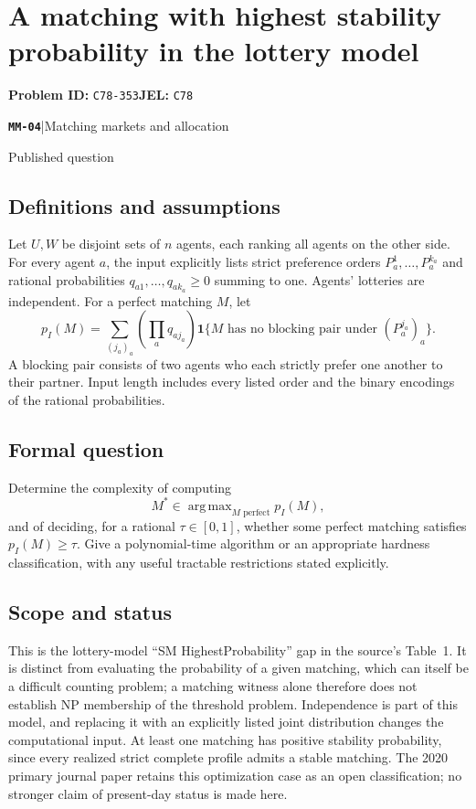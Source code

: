 \documentclass[11pt,a4paper]{article}
\newcommand{\ind}{\mathbf 1}
\DeclareMathOperator*{\argmax}{arg\,max}
\newcommand{\entrymeta}[3]{{\sffamily\small\color{muted}\textbf{\texttt{#1}}\quad|\quad #2\par #3\par}}
\begin{document}
\section*{A matching with highest stability probability in the lottery model}
\textbf{Problem ID:} \texttt{C78-353}\quad \textbf{JEL:} \texttt{C78}\par
\label{problem:OP-0545}
\label{beyond:MM-04}
\entrymeta{MM-04}{Matching markets and allocation}{Published question}
\subsection*{Definitions and assumptions}
Let $U,W$ be disjoint sets of $n$ agents, each ranking all agents on the other side. For every agent $a$, the input explicitly lists strict preference orders $P_a^1,\ldots,P_a^{k_a}$ and rational probabilities $q_{a1},\ldots,q_{ak_a}\ge0$ summing to one. Agents' lotteries are independent. For a perfect matching $M$, let
\[
 p_I(M)=\sum_{(j_a)_a}\left(\prod_a q_{a j_a}\right)
 \ind\{M\text{ has no blocking pair under }(P_a^{j_a})_a\}.
\]
A blocking pair consists of two agents who each strictly prefer one another to their partner. Input length includes every listed order and the binary encodings of the rational probabilities.
\subsection*{Formal question}
Determine the complexity of computing
\[
 M^*\in\argmax_{M\text{ perfect}}p_I(M),
\]
and of deciding, for a rational $\tau\in[0,1]$, whether some perfect matching satisfies $p_I(M)\ge\tau$. Give a polynomial-time algorithm or an appropriate hardness classification, with any useful tractable restrictions stated explicitly.
\subsection*{Scope and status}
This is the lottery-model ``SM HighestProbability'' gap in the source's Table~1. It is distinct from evaluating the probability of a given matching, which can itself be a difficult counting problem; a matching witness alone therefore does not establish NP membership of the threshold problem. Independence is part of this model, and replacing it with an explicitly listed joint distribution changes the computational input. At least one matching has positive stability probability, since every realized strict complete profile admits a stable matching. The 2020 primary journal paper retains this optimization case as an open classification; no stronger claim of present-day status is made here.
\end{document}
